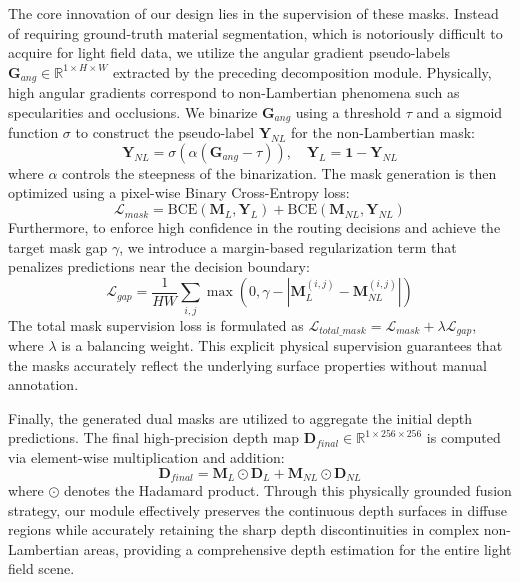 \documentclass[lettersize,journal]{IEEEtran}
\begin{document}
The core innovation of our design lies in the supervision of these masks. Instead of requiring ground-truth material segmentation, which is notoriously difficult to acquire for light field data, we utilize the angular gradient pseudo-labels $\mathbf{G}_{ang} \in \mathbb{R}^{1 \times H \times W}$ extracted by the preceding decomposition module. Physically, high angular gradients correspond to non-Lambertian phenomena such as specularities and occlusions. We binarize $\mathbf{G}_{ang}$ using a threshold $\tau$ and a sigmoid function $\sigma$ to construct the pseudo-label $\mathbf{Y}_{NL}$ for the non-Lambertian mask:
\begin{equation}
\label{eq:eq19}
\mathbf{Y}_{NL} = \sigma(\alpha (\mathbf{G}_{ang} - \tau)), \quad \mathbf{Y}_L = \mathbf{1} - \mathbf{Y}_{NL}
\end{equation}
where $\alpha$ controls the steepness of the binarization. The mask generation is then optimized using a pixel-wise Binary Cross-Entropy loss:
\begin{equation}
\label{eq:eq20}
\mathcal{L}_{mask} = \text{BCE}(\mathbf{M}_L, \mathbf{Y}_L) + \text{BCE}(\mathbf{M}_{NL}, \mathbf{Y}_{NL})
\end{equation}
Furthermore, to enforce high confidence in the routing decisions and achieve the target mask gap $\gamma$, we introduce a margin-based regularization term that penalizes predictions near the decision boundary:
\begin{equation}
\label{eq:eq21}
\mathcal{L}_{gap} = \frac{1}{HW} \sum_{i,j} \max(0, \gamma - |\mathbf{M}_L^{(i,j)} - \mathbf{M}_{NL}^{(i,j)}|)
\end{equation}
The total mask supervision loss is formulated as $\mathcal{L}_{total\_mask} = \mathcal{L}_{mask} + \lambda \mathcal{L}_{gap}$, where $\lambda$ is a balancing weight. This explicit physical supervision guarantees that the masks accurately reflect the underlying surface properties without manual annotation.

Finally, the generated dual masks are utilized to aggregate the initial depth predictions. The final high-precision depth map $\mathbf{D}_{final} \in \mathbb{R}^{1 \times 256 \times 256}$ is computed via element-wise multiplication and addition:
\begin{equation}
\label{eq:eq22}
\mathbf{D}_{final} = \mathbf{M}_L \odot \mathbf{D}_L + \mathbf{M}_{NL} \odot \mathbf{D}_{NL}
\end{equation}
where $\odot$ denotes the Hadamard product. Through this physically grounded fusion strategy, our module effectively preserves the continuous depth surfaces in diffuse regions while accurately retaining the sharp depth discontinuities in complex non-Lambertian areas, providing a comprehensive depth estimation for the entire light field scene.
\end{document}
